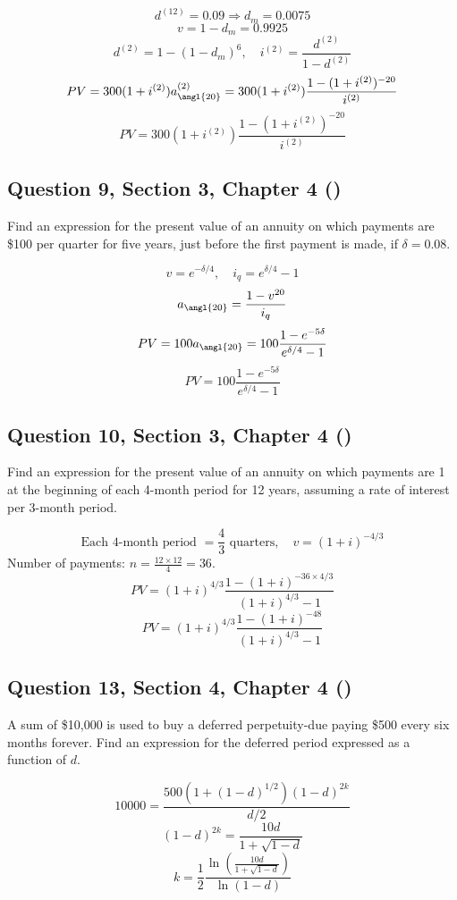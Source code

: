 \documentclass[12pt, a4paper]{article}
\begin{document}
\[
d^{(12)} = 0.09 \Rightarrow d_m = 0.0075
\]
\[
v = 1 - d_m = 0.9925
\]
\[
d^{(2)} = 1 - (1 - d_m)^6, \quad i^{(2)} = \frac{d^{(2)}}{1 - d^{(2)}}
\]
\[
PV = 300 (1 + i^{(2)}) a_{\angl{20}}^{(2)} = 300 (1 + i^{(2)}) \frac{1 - (1 + i^{(2)})^{-20}}{i^{(2)}}
\]
\[
\boxed{PV = 300(1 + i^{(2)}) \frac{1 - (1 + i^{(2)})^{-20}}{i^{(2)}}}
\]

\subsection*{Question 9, Section 3, Chapter 4  (\cite{toi3rd})}

\noindent Find an expression for the present value of an annuity on which payments are \$100 per quarter for five years, just before the first payment is made, if \( \delta = 0.08. \)

\[
v = e^{-\delta/4}, \quad i_q = e^{\delta/4} - 1
\]
\[
a_{\angl{20}} = \frac{1 - v^{20}}{i_q}
\]
\[
PV = 100 a_{\angl{20}} = 100 \frac{1 - e^{-5\delta}}{e^{\delta/4} - 1}
\]
\[
\boxed{PV = 100 \frac{1 - e^{-5\delta}}{e^{\delta/4} - 1}}
\]

\subsection*{Question 10, Section 3, Chapter 4  (\cite{toi3rd})}

\noindent Find an expression for the present value of an annuity on which payments are 1 at the beginning of each 4-month period for 12 years, assuming a rate of interest per 3-month period.

\[
\text{Each 4-month period } = \frac{4}{3} \text{ quarters}, \quad v = (1 + i)^{-4/3}
\]
Number of payments: \( n = \frac{12 \times 12}{4} = 36 \).
\[
PV = (1 + i)^{4/3} \frac{1 - (1 + i)^{-36 \times 4/3}}{(1 + i)^{4/3} - 1}
\]
\[
\boxed{PV = (1 + i)^{4/3} \frac{1 - (1 + i)^{-48}}{(1 + i)^{4/3} - 1}}
\]

\subsection*{Question 13, Section 4, Chapter 4  (\cite{toi3rd})}

\noindent A sum of \$10{,}000 is used to buy a deferred perpetuity-due paying \$500 every six months forever. Find an expression for the deferred period expressed as a function of \( d. \)

\[
10000 = \frac{500 (1 + (1 - d)^{1/2})(1 - d)^{2k}}{d/2}
\]
\[
(1 - d)^{2k} = \frac{10d}{1 + \sqrt{1 - d}}
\]
\[
\boxed{k = \frac{1}{2} \frac{\ln\!\left(\frac{10d}{1 + \sqrt{1 - d}}\right)}{\ln(1 - d)}}
\]
\end{document}
